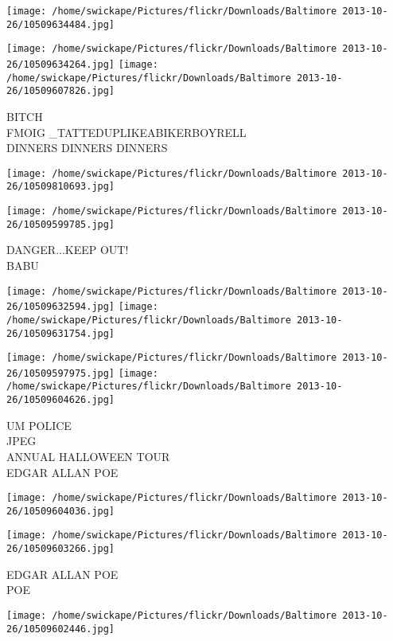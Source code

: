 \documentclass[10pt,letterpaper]{article}
\begin{document}
\texttt{[image: /home/swickape/Pictures/flickr/Downloads/Baltimore 2013-10-26/10509634484.jpg]}

\vspace{0.25in}
\texttt{[image: /home/swickape/Pictures/flickr/Downloads/Baltimore 2013-10-26/10509634264.jpg]}
\texttt{[image: /home/swickape/Pictures/flickr/Downloads/Baltimore 2013-10-26/10509607826.jpg]}

BITCH\\
FMOIG \_TATTEDUPLIKEABIKERBOYRELL\\
DINNERS DINNERS DINNERS\\
\pagebreak

\texttt{[image: /home/swickape/Pictures/flickr/Downloads/Baltimore 2013-10-26/10509810693.jpg]}

\vspace{0.25in}
\texttt{[image: /home/swickape/Pictures/flickr/Downloads/Baltimore 2013-10-26/10509599785.jpg]}

DANGER...KEEP OUT!\\
BABU\\
\pagebreak

\texttt{[image: /home/swickape/Pictures/flickr/Downloads/Baltimore 2013-10-26/10509632594.jpg]}
\texttt{[image: /home/swickape/Pictures/flickr/Downloads/Baltimore 2013-10-26/10509631754.jpg]}

\texttt{[image: /home/swickape/Pictures/flickr/Downloads/Baltimore 2013-10-26/10509597975.jpg]}
\texttt{[image: /home/swickape/Pictures/flickr/Downloads/Baltimore 2013-10-26/10509604626.jpg]}

UM POLICE\\
JPEG\\
ANNUAL HALLOWEEN TOUR\\
EDGAR ALLAN POE\\
\pagebreak

\texttt{[image: /home/swickape/Pictures/flickr/Downloads/Baltimore 2013-10-26/10509604036.jpg]}

\vspace{0.25in}
\texttt{[image: /home/swickape/Pictures/flickr/Downloads/Baltimore 2013-10-26/10509603266.jpg]}

EDGAR ALLAN POE\\
POE\\
\pagebreak

\texttt{[image: /home/swickape/Pictures/flickr/Downloads/Baltimore 2013-10-26/10509602446.jpg]}
\end{document}
